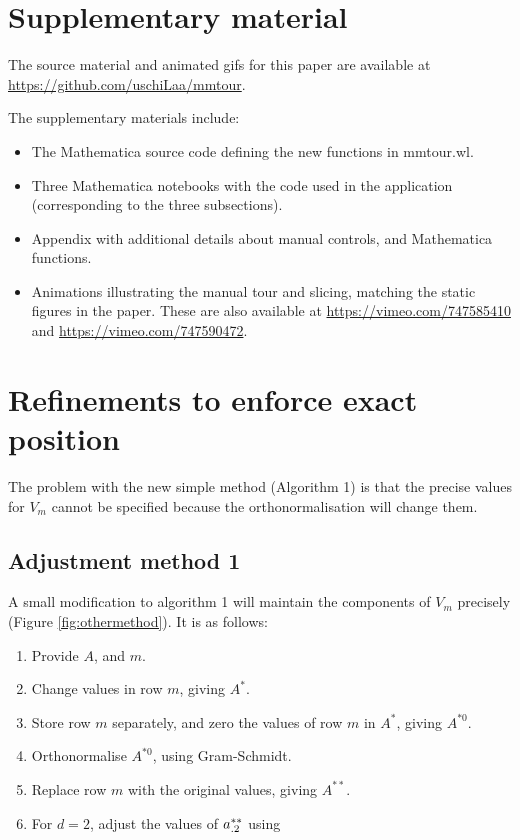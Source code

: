 \documentclass[]{interact}
\theoremstyle{plain}%
\theoremstyle{definition}
\theoremstyle{remark}
\def\tightlist{}
\begin{document}
\hypertarget{supplementary-material}{%
\section*{Supplementary material}\label{supplementary-material}}

The source material and animated gifs for this paper are available at
\url{https://github.com/uschiLaa/mmtour}.

The supplementary materials include:

\begin{itemize}
\tightlist
\item
  The Mathematica source code defining the new functions in mmtour.wl.
\item
  Three Mathematica notebooks with the code used in the application
  (corresponding to the three subsections).
\item
  Appendix with additional details about manual controls, and
  Mathematica functions.
\item
  Animations illustrating the manual tour and slicing, matching the
  static figures in the paper. These are also available at
  \url{https://vimeo.com/747585410} and
  \url{https://vimeo.com/747590472}.
\end{itemize}

\appendix

\hypertarget{refinements-to-enforce-exact-position-1}{%
\section{Refinements to enforce exact
position}\label{refinements-to-enforce-exact-position-1}}

The problem with the new simple method (Algorithm 1) is that the precise
values for \(V_m\) cannot be specified because the orthonormalisation
will change them.

\hypertarget{adjustment-method-1}{%
\subsection{Adjustment method 1}\label{adjustment-method-1}}

A small modification to algorithm 1 will maintain the components of
\(V_m\) precisely (Figure \ref{fig:othermethod}). It is as follows:

\begin{enumerate}
\def\labelenumi{\arabic{enumi}.}
\tightlist
\item
  Provide \(A\), and \(m\).
\item
  Change values in row \(m\), giving \(A^*\).
\item
  Store row \(m\) separately, and zero the values of row \(m\) in
  \(A^*\), giving \(A^{*0}\).
\item
  Orthonormalise \(A^{*0}\), using Gram-Schmidt.
\item
  Replace row \(m\) with the original values, giving \(A^{**}\).
\item
  For \(d=2\), adjust the values of \({\boldmath a}^{**}_{.2}\) using
\end{enumerate}
\end{document}
